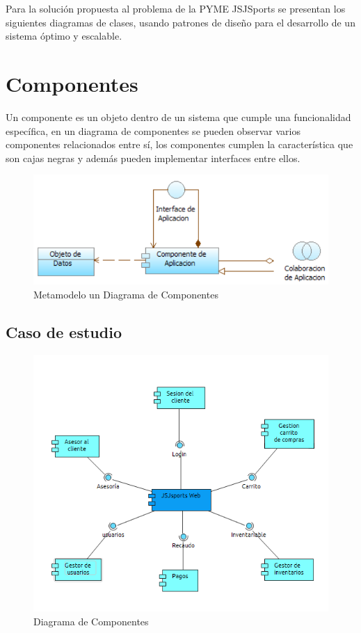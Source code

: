 Para la solución propuesta al problema de la PYME JSJSports se presentan los siguientes diagramas de clases, usando patrones de diseño para el desarrollo de un sistema óptimo y escalable.

\newpage

\section{Componentes}
Un componente es un objeto dentro de un sistema que cumple una funcionalidad específica, en un diagrama de componentes se pueden observar varios componentes relacionados entre sí, los componentes cumplen la característica que son cajas negras y además pueden implementar interfaces entre ellos.

\begin{figure}[th!]
	\centering
	\includegraphics[width=0.7\linewidth]{arquitectura/imagenes/modeloEstructuraAplicacion}
	\caption{Metamodelo un Diagrama de Componentes}
	\label{fig:metamodeloComponentes}
\end{figure}

\subsection*{Caso de estudio}
\begin{figure}[th!]
	\centering
	\includegraphics[width=0.7\linewidth]{arquitectura/imagenes/PuntoVistaEstructuraAplicacion}
	\caption{Diagrama de Componentes}
	\label{fig:componentes}
\end{figure}

